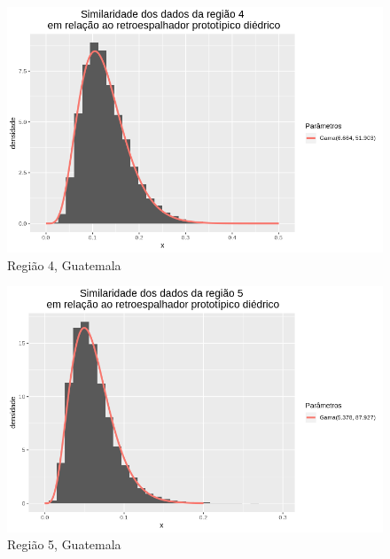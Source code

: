 \documentclass[12pt]{article}
\begin{document}
\begin{figure}[!h]
    \centering
    \vspace{0.15\linewidth}
    \includegraphics[width = 0.95\linewidth]{../../Images/Report_18_12_17/di_region4.png}
    \caption{Região 4, Guatemala}
    \label{fig:di_r4}
\end{figure}

\begin{figure}[!h]
    \centering
    \vspace{0.1\linewidth}
    \includegraphics[width = 0.95\linewidth]{../../Images/Report_18_12_17/di_region5.png}
    \caption{Região 5, Guatemala}
    \label{fig:di_r5}
\end{figure}
\end{document}
